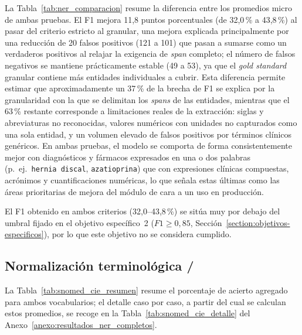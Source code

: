 La Tabla~\ref{tab:ner_comparacion} resume la diferencia entre los promedios micro de ambas
pruebas. El F1 mejora 11,8 puntos porcentuales (de 32,0\,\% a 43,8\,\%) al pasar del criterio
estricto al granular, una mejora explicada principalmente por una reducción de 20 falsos
positivos (121 a 101) que pasan a sumarse como un verdaderos positivos al relajar la
exigencia de \textit{span} completo; el número de falsos negativos se mantiene prácticamente
estable (49 a 53), ya que el \textit{gold standard} granular contiene más entidades individuales
a cubrir. Esta diferencia permite estimar que aproximadamente un 37\,\% de la brecha de F1
se explica por la granularidad con la que se delimitan los
\textit{spans} de las entidades, mientras que el 63\,\% restante corresponde a limitaciones reales
de la extracción: siglas y abreviaturas no reconocidas, valores numéricos con unidades no
capturados como una sola entidad, y un volumen elevado de falsos positivos por términos clínicos
genéricos. En ambas pruebas, el modelo se comporta de forma consistentemente mejor con
diagnósticos y fármacos expresados en una o dos palabras (p.\ ej.\ \texttt{hernia discal},
\texttt{azatioprina}) que con expresiones clínicas compuestas, acrónimos y cuantificaciones
numéricas, lo que señala estas últimas como las áreas prioritarias de mejora del módulo
 de cara a un uso en producción.



El F1 obtenido en ambos criterios (32,0--43,8\,\%) se sitúa muy por debajo del umbral fijado en el
objetivo específico~2 ($F1 \ge 0,85$, Sección~\ref{section:objetivos-especificos}), por lo que este
objetivo no se considera cumplido.

\subsection{Normalización terminológica /}\label{subsection:resultados_snomed}

La Tabla~\ref{tab:snomed_cie_resumen} resume el porcentaje de acierto agregado para ambos
vocabularios; el detalle caso por caso, a partir del cual se calculan estos promedios, se recoge en
la Tabla~\ref{tab:snomed_cie_detalle} del Anexo~\ref{anexo:resultados_ner_completos}.




